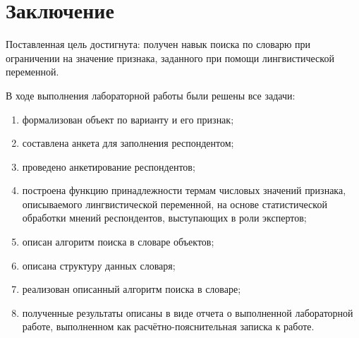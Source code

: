 \chapter*{Заключение}

Поставленная цель достигнута: получен навык поиска по словарю при ограничении на значение признака, заданного при помощи лингвистической переменной.

В ходе выполнения лабораторной работы были решены все задачи:

\begin{enumerate}[label=\arabic*)]
	\item формализован объект по варианту и его признак;
	\item составлена анкета для заполнения респондентом;
	\item проведено анкетирование респондентов;
	\item построена функцию принадлежности термам числовых значений признака, описываемого лингвистической переменной, на основе статистической обработки мнений респондентов, выступающих в роли экспертов;
	\item описан алгоритм поиска в словаре объектов;
	\item описана структуру данных словаря;
	\item реализован описанный алгоритм поиска в словаре;
	\item полученные результаты описаны в виде отчета о выполненной лабораторной работе, выполненном как расчётно-пояснительная записка к работе.
\end{enumerate}